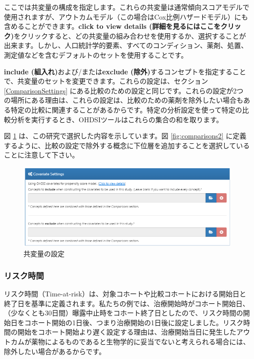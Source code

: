 \documentclass[
  11pt]{book}
\theoremstyle{definition}
\theoremstyle{definition}
\theoremstyle{definition}
\theoremstyle{definition}
\theoremstyle{remark}
\begin{document}
ここでは共変量の構成を指定します。これらの共変量は通常傾向スコアモデルで使用されますが、アウトカムモデル（この場合はCox比例ハザードモデル）にも含めることができます。\textbf{click to view details (詳細を見るにはここをクリック)}をクリックすると、どの共変量の組み合わせを使用するか、選択することが出来ます。しかし、人口統計学的要素、すべてのコンディション、薬剤、処置、測定値などを含むデフォルトのセットを使用することです。

\textbf{include (組入れ)}および/または\textbf{exclude (除外)}するコンセプトを指定することで、共変量のセットを変更できます。これらの設定は、セクション \ref{ComparisonSettings} にある比較のための設定と同じです。これらの設定が2つの場所にある理由は、これらの設定は、比較のための薬剤を除外したい場合もある特定の比較に関連することがあるからです。特定の分析設定を使って特定の比較分析を実行するとき、OHDSIツールはこれらの集合の和を取ります。

図 \ref{fig:covariateSettings} は、この研究で選択した内容を示しています。図 \ref{fig:comparisons2} に定義するように、比較の設定で除外する概念に下位層を追加することを選択していることに注意して下さい。

\begin{figure}

{\centering \includegraphics[width=1\linewidth]{images/PopulationLevelEstimation/covariateSettings} 

}

\caption{共変量の設定}\label{fig:covariateSettings}
\end{figure}

\subsubsection*{リスク時間}\label{ux30eaux30b9ux30afux6642ux9593}

リスク時間（Time-at-risk）は、対象コホートや比較コホートにおける開始日と終了日を基準に定義されます。私たちの例では、治療開始時がコホート開始日、（少なくとも30日間）曝露中止時をコホート終了日としたので、リスク時間の開始日をコホート開始の1日後、つまり治療開始の1日後に設定しました。リスク時間の開始をコホート開始より遅く設定する理由は、治療開始当日に発生したアウトカムが薬物によるものであると生物学的に妥当でないと考えられる場合には、除外したい場合があるからです。
\end{document}
